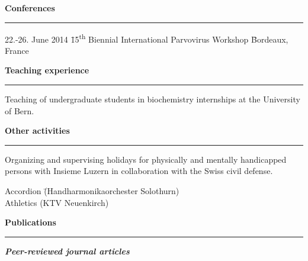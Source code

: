 \vspace{0.6 cm}
\large
\textbf{Conferences}
\noindent\rule[3mm]{\linewidth}{1pt}

\normalsize
\vspace{-0.7cm}
\begin{tabbing}
22.-26. June 2014 \hspace{1.38 cm} \= 15\textsuperscript{th} Biennial International Parvovirus Workshop \hspace{0.1 cm} \= Bordeaux, France

\end{tabbing}




\vspace{0.3 cm}
\large
\textbf{Teaching experience}
\noindent\rule[3mm]{\linewidth}{1pt}

\normalsize
\vspace{-0.5cm}
\vspace{0.2 cm}
Teaching of undergraduate students in biochemistry internships at the University of Bern.

\vspace{0.6 cm}
\large
\textbf{Other activities}
\noindent\rule[3mm]{\linewidth}{1pt}

\normalsize
\vspace{-0.5cm}
\vspace{0.2 cm}
Organizing and supervising holidays for physically and mentally handicapped persons with Insieme Luzern in collaboration with the Swiss civil defense.
\vspace{-0.1 cm}
\begin{tabbing}
Accordion \=(Handharmonikaorchester Solothurn) \\[0.15 cm]
Athletics \>(KTV Neuenkirch) 
\end{tabbing}

\vspace{0.3 cm}
\large
\textbf{Publications}
\noindent\rule[3mm]{\linewidth}{1pt}

\normalsize

\vspace{0.2 cm}
\vspace{-0.5cm}
\textbf{\emph{Peer-reviewed journal articles}} \\[0.3 cm]

